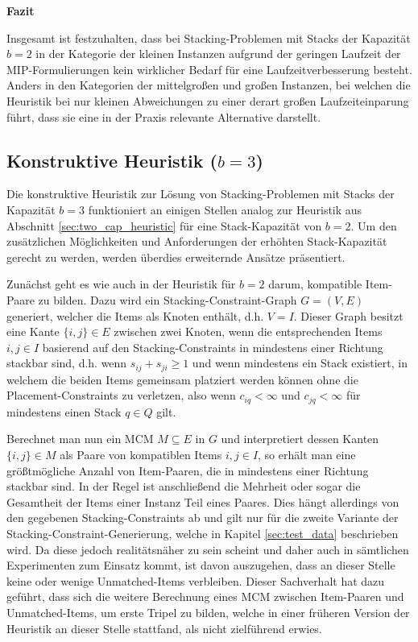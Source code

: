 \textbf{Fazit}

Insgesamt ist festzuhalten, dass bei Stacking-Problemen mit Stacks der Kapazität $b = 2$ in der Kategorie der kleinen Instanzen
aufgrund der geringen Laufzeit der MIP-Formulierungen kein wirklicher Bedarf für eine Laufzeitverbesserung besteht.
Anders in den Kategorien der mittelgroßen und großen Instanzen, bei welchen die Heuristik bei nur kleinen Abweichungen zu einer
derart großen Laufzeiteinparung führt, dass sie eine in der Praxis relevante Alternative darstellt.

\subsection{Konstruktive Heuristik ($b = 3$)}
\label{sec:three_cap_heuristic}

Die konstruktive Heuristik zur Lösung von Stacking-Problemen mit Stacks der Kapazität $b = 3$ funktioniert
an einigen Stellen analog zur Heuristik aus Abschnitt \ref{sec:two_cap_heuristic} für eine Stack-Kapazität von $b = 2$.
Um den zusätzlichen Möglichkeiten und Anforderungen der erhöhten Stack-Kapazität gerecht zu werden, werden überdies
erweiternde Ansätze präsentiert.

Zunächst geht es wie auch in der Heuristik für $b = 2$ darum, kompatible Item-Paare zu bilden. Dazu wird ein
Stacking-Constraint-Graph $G = (V, E)$ generiert, welcher die Items als Knoten enthält, d.h. $V = I$.
Dieser Graph besitzt eine Kante $\{i, j\} \in E$ zwischen zwei Knoten, wenn die entsprechenden Items $i, j \in I$
basierend auf den Stacking-Constraints in mindestens einer Richtung stackbar sind, d.h. wenn $s_{ij} + s_{ji} \geq 1$
und wenn mindestens ein Stack existiert, in welchem die beiden Items gemeinsam platziert werden können ohne die Placement-Constraints
zu verletzen, also wenn $c_{iq} < \infty$ und $c_{jq} < \infty$ für mindestens einen Stack $q \in Q$ gilt.

Berechnet man nun ein \textsc{MCM} $M \subseteq E$ in $G$ und interpretiert dessen Kanten $\{i, j\} \in M$ als Paare von kompatiblen Items
$i, j \in I$, so erhält man eine größtmögliche Anzahl von Item-Paaren, die in mindestens einer Richtung stackbar sind.
In der Regel ist anschließend die Mehrheit oder sogar die Gesamtheit der Items einer Instanz Teil eines Paares.
Dies hängt allerdings von den gegebenen Stacking-Constraints ab und gilt nur für die zweite Variante der Stacking-Constraint-Generierung, welche in Kapitel \ref{sec:test_data} beschrieben wird. Da diese jedoch realitätsnäher zu sein scheint und daher auch in sämtlichen Experimenten zum Einsatz kommt, ist davon auszugehen, dass an dieser Stelle keine oder wenige Unmatched-Items verbleiben.
Dieser Sachverhalt hat dazu geführt, dass sich die weitere Berechnung eines \textsc{MCM} zwischen Item-Paaren und Unmatched-Items,
um erste Tripel zu bilden, welche in einer früheren Version der Heuristik an dieser Stelle stattfand, als nicht zielführend
erwies.

